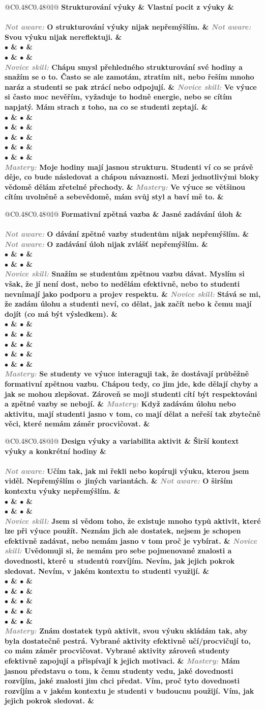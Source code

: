 \documentclass[twoside,openany]{book}
\makeatletter
\newcommand{\note}[1]{\textcolor{gray}{\small\itshape #1}}
\newcommand{\rubricpage}[8]{
\newpage
\begin{tabular}{@{}C{0.48\textwidth}C{0.48\textwidth}@{}l@{}}
\normalsize \bfseries #1 & \normalsize \bfseries #5 & \\[1em] \hline \\[-1.2em]
	\justify \note{Not aware:} #2 & \justify \note{Not aware:} #6 & \\[2em]
$\bullet$ & $\bullet$ & \\
$\bullet$ & $\bullet$ & \\
\justify \note{Novice skill:} #3 & \justify \note{Novice skill:} #7 & \\[3em]
$\bullet$ & $\bullet$ & \\
$\bullet$ & $\bullet$ & \\
$\bullet$ & $\bullet$ & \\
$\bullet$ & $\bullet$ & \\
$\bullet$ & $\bullet$ & \\
\justify \note{Mastery:} #4 & \justify \note{Mastery:} #8 &
\end{tabular}
}
\makeatother
\begin{document}
\rubricpage{Strukturování výuky}
{O strukturování výuky nijak nepřemýšlím.}
{Chápu smysl přehledného strukturování své hodiny a snažím se o to. Často se ale zamotám, ztratím nit, nebo řeším mnoho naráz a studenti se pak ztrácí nebo odpojují.}
{Moje hodiny mají jasnou strukturu. Studenti ví co se právě děje, co bude následovat a chápou návaznosti. Mezi jednotlivými bloky vědomě dělám zřetelné přechody.}
{Vlastní pocit z výuky}
{Svou výuku nijak nereflektuji.}
{Ve výuce si často moc nevěřím, vyžaduje to hodně energie, nebo se cítím napjatý. Mám strach z toho, na co se studenti zeptají.}
{Ve výuce se většinou cítím uvolněně a sebevědomě, mám svůj styl a baví mě to.}

\rubricpage{Formativní zpětná vazba}
{O dávání zpětné vazby studentům nijak nepřemýšlím.}
{Snažím se studentům zpětnou vazbu dávat. Myslím si však, že jí není dost, nebo to nedělám efektivně, nebo to studenti nevnímají jako podporu a projev respektu.}
{Se studenty ve výuce interaguji tak, že dostávají průběžně formativní zpětnou vazbu. Chápou tedy, co jim jde, kde dělají chyby a jak se mohou zlepšovat. Zároveň se moji studenti cítí být respektováni a zpětné vazby se nebojí.}
{Jasné zadávání úloh}
{O zadávání úloh nijak zvlášť nepřemýšlím.}
{Stává se mi, že zadám úlohu a studenti neví, co dělat, jak začít nebo k čemu mají dojít (co má být výsledkem).}
{Když zadávám úlohu nebo aktivitu, mají studenti jasno v tom, co mají dělat a neřeší tak zbytečně věci, které nemám záměr procvičovat.}

\rubricpage{Design výuky a variabilita aktivit}
{Učím tak, jak mi řekli nebo kopíruji výuku, kterou jsem viděl. Nepřemýšlím o~jiných variantách.}
{Jsem si vědom toho, že existuje mnoho typů aktivit, které lze při výuce použít. Neznám jich ale dostatek, nejsem je schopen efektivně zadávat, nebo nemám jasno v tom proč je vybírat.}
{Znám dostatek typů aktivit, svou výuku skládám tak, aby byla dostatečně pestrá. Vybrané aktivity efektivně učí/procvičují to, co mám záměr procvičovat. Vybrané aktivity zároveň studenty efektivně zapojují a přispívají k jejich motivaci.}
{Širší kontext výuky a konkrétní hodiny}
{O širším kontextu výuky nepřemýšlím.}
{Uvědomuji si, že nemám pro sebe pojmenované znalosti a dovednosti, které u~studentů rozvíjím. Nevím, jak jejich pokrok sledovat. Nevím, v jakém kontextu to studenti využijí.}
{Mám jasnou představu o tom, k čemu studenty vedu, jaké dovednosti rozvíjím, jaké znalosti jim chci předat. Vím, proč tyto dovednosti rozvíjím a v jakém kontextu je studenti v budoucnu použijí. Vím, jak jejich pokrok sledovat.}
\vspace*{-1em}
\end{document}
